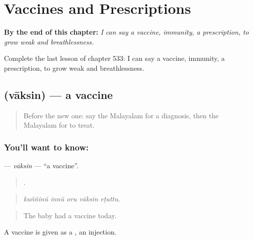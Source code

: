 
\chapter{Vaccines and Prescriptions}
\label{ch:ml-vaccines-and-prescriptions}

\begin{chapteropening}
\textbf{By the end of this chapter:} \emph{I can say a vaccine, immunity, a prescription, to grow weak and breathlessness.}

Complete the last lesson of chapter 533: I can say a vaccine, immunity, a prescription, to grow weak and breathlessness.
\end{chapteropening}

\section[\texorpdfstring{\ml{വാക്സിൻ} (vāksin)}{വാക്സിൻ (vāksin)}]{ (vāksin) — a vaccine}

\label{lesson:ML-C533-vaksin}



\begin{quote}
Before the new one: say the Malayalam for a diagnosis, then the Malayalam for to treat.
\end{quote}

\subsection*{You'll want to know: }
\textbf{} — \emph{vāksin} — \textquotedblleft{}a vaccine\textquotedblright{}.

\begin{quote}
    .
\end{quote}

\begin{quote}
\emph{kuññinŭ innŭ oru vāksin eṭuttu.}
\end{quote}

\begin{quote}
The baby had a vaccine today.
\end{quote}

A vaccine is given as a , an injection.

